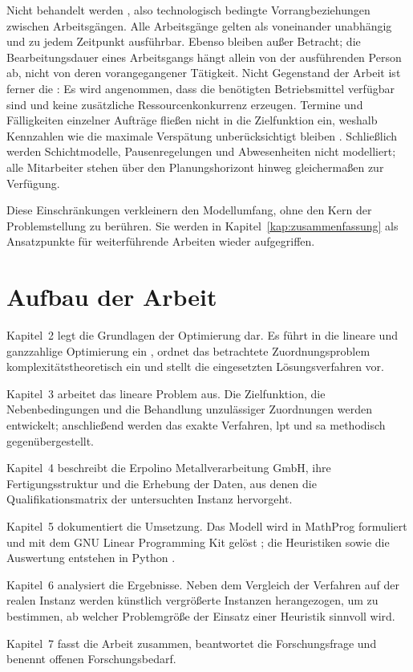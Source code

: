 Nicht behandelt werden , also technologisch
bedingte Vorrangbeziehungen zwischen Arbeitsgängen. Alle Arbeitsgänge gelten als
voneinander unabhängig und zu jedem Zeitpunkt ausführbar. Ebenso bleiben
 außer Betracht; die Bearbeitungsdauer eines Arbeitsgangs hängt
allein von der ausführenden Person ab, nicht von deren vorangegangener Tätigkeit.
Nicht Gegenstand der Arbeit ist ferner die : Es wird
angenommen, dass die benötigten Betriebsmittel verfügbar sind und keine zusätzliche
Ressourcenkonkurrenz erzeugen. Termine und Fälligkeiten einzelner Aufträge fließen
nicht in die Zielfunktion ein, weshalb Kennzahlen wie die maximale Verspätung
unberücksichtigt bleiben \parencite{pinedo2016scheduling}. Schließlich werden
Schichtmodelle, Pausenregelungen und Abwesenheiten nicht modelliert; alle
Mitarbeiter stehen über den Planungshorizont hinweg gleichermaßen zur Verfügung.

Diese Einschränkungen verkleinern den Modellumfang, ohne den Kern der
Problemstellung zu berühren. Sie werden in Kapitel~\ref{kap:zusammenfassung} als
Ansatzpunkte für weiterführende Arbeiten wieder aufgegriffen.

\section{Aufbau der Arbeit}
\label{sec:aufbau}

Kapitel~2 legt die Grundlagen der Optimierung dar. Es führt in die lineare und
ganzzahlige Optimierung ein \parencite{wolsey2020integer}, ordnet das betrachtete
Zuordnungsproblem komplexitätstheoretisch ein \parencite{garey1979computers} und
stellt die eingesetzten Lösungsverfahren vor.

Kapitel~3 arbeitet das lineare Problem aus. Die Zielfunktion, die Nebenbedingungen
und die Behandlung unzulässiger Zuordnungen werden entwickelt; anschließend werden
das exakte Verfahren, \ac{lpt} und \ac{sa} methodisch gegenübergestellt.

Kapitel~4 beschreibt die Erpolino Metallverarbeitung GmbH, ihre Fertigungsstruktur
und die Erhebung der Daten, aus denen die Qualifikationsmatrix der untersuchten
Instanz hervorgeht.

Kapitel~5 dokumentiert die Umsetzung. Das Modell wird in MathProg formuliert und
mit dem GNU Linear Programming Kit gelöst \parencite{glpk}; die Heuristiken sowie
die Auswertung entstehen in Python \parencite{harris2020array,hunter2007matplotlib}.

Kapitel~6 analysiert die Ergebnisse. Neben dem Vergleich der Verfahren auf der
realen Instanz werden künstlich vergrößerte Instanzen herangezogen, um zu bestimmen,
ab welcher Problemgröße der Einsatz einer Heuristik sinnvoll wird.

Kapitel~7 fasst die Arbeit zusammen, beantwortet die Forschungsfrage und benennt
offenen Forschungsbedarf.
